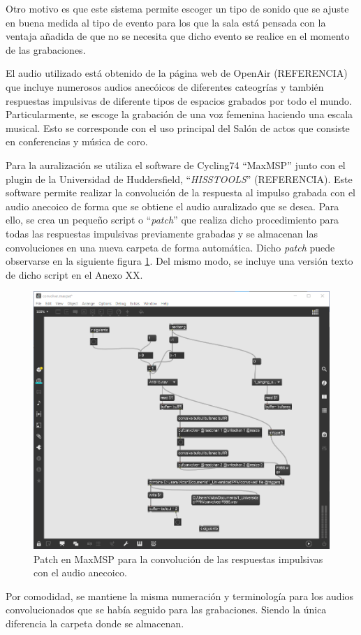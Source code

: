 \documentclass[11pt,a4paper,twoside]{book}
\begin{document}
        Otro motivo es que este sistema permite escoger un tipo de sonido que se ajuste en buena medida al tipo de evento para los que la sala está pensada con la ventaja añadida de que no se necesita que dicho evento se realice en el momento de las grabaciones.
        
        El audio utilizado está obtenido de la página web de OpenAir (REFERENCIA) que incluye numerosos audios anecóicos de diferentes cateogrías y también respuestas impulsivas de diferente tipos de espacios grabados por todo el mundo. Particularmente, se escoge la grabación de una voz femenina haciendo una escala musical. Esto se corresponde con el uso principal del Salón de actos que consiste en conferencias y música de coro.
        
        Para la auralización se utiliza el software de Cycling74 ``MaxMSP'' junto con el plugin de la Universidad de Huddersfield, ``\textit{HISSTOOLS}'' (REFERENCIA). Este software permite realizar la convolución de la respuesta al impulso grabada con el audio anecoico de forma que se obtiene el audio auralizado que se desea. Para ello, se crea un pequeño script o ``\textit{patch}'' que realiza dicho procedimiento para todas las respuestas impulsivas previamente grabadas y se almacenan las convoluciones en una nueva carpeta de forma automática. Dicho \textit{patch} puede observarse en la siguiente figura \ref{fig:convolver_max}. Del mismo modo, se incluye una versión texto de dicho script en el Anexo XX.
        
        \begin{figure}
	        \includegraphics[scale=0.4]{../imagenes/convolver_max.png}
			\centering
			\caption{Patch en MaxMSP para la convolución de las respuestas impulsivas con el audio anecoico.}
			\label{fig:convolver_max}
	    \end{figure}
        
        Por comodidad, se mantiene la misma numeración y terminología para los audios convolucionados que se había seguido para las grabaciones. Siendo la única diferencia la carpeta donde se almacenan.
\end{document}

